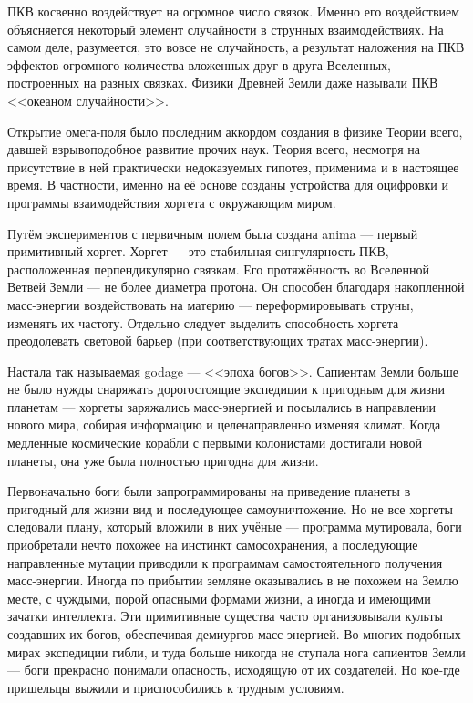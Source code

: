 \documentclass[a4paper,10pt]{book}
\begin{document}
ПКВ косвенно воздействует на огромное число связок. Именно его воздействием 
объясняется некоторый элемент случайности в струнных взаимодействиях. На самом 
деле, разумеется, это вовсе не случайность, а результат наложения на ПКВ 
эффектов огромного количества вложенных друг в друга Вселенных, построенных на 
разных связках. Физики Древней Земли даже называли ПКВ <<океаном случайности>>.

Открытие омега-поля было последним
аккордом создания в физике Теории всего, давшей взрывоподобное развитие 
прочих наук. Теория всего, несмотря на присутствие в ней практически 
недоказуемых
гипотез, применима и в настоящее время. В частности, именно на её основе созданы
устройства для оцифровки и программы взаимодействия хоргета с окружающим миром. 

Путём экспериментов с первичным полем была создана 
anima --- первый примитивный хоргет. Хоргет --- это стабильная сингулярность 
ПКВ, расположенная перпендикулярно связкам. Его протяжённость во Вселенной 
Ветвей Земли --- не более диаметра протона. Он способен благодаря накопленной 
масс-энергии воздействовать на материю --- переформировывать струны, изменять 
их частоту.
Отдельно следует выделить способность хоргета преодолевать световой барьер (при 
соответствующих тратах масс-энергии).

Настала так называемая godage --- <<эпоха богов>>. Сапиентам Земли больше не 
было нужды снаряжать дорогостоящие экспедиции к пригодным для жизни планетам 
--- хоргеты заряжались масс-энергией и посылались в направлении нового мира, 
собирая информацию и целенаправленно изменяя климат. Когда медленные 
космические корабли с первыми колонистами достигали новой планеты, она уже была 
полностью пригодна для жизни.

Первоначально боги были запрограммированы на приведение планеты в пригодный для 
жизни вид и последующее самоуничтожение. Но не все хоргеты следовали плану, 
который вложили в них учёные --- программа мутировала, боги приобретали нечто 
похожее на инстинкт самосохранения, а последующие направленные мутации 
приводили 
к программам самостоятельного получения масс-энергии. Иногда по прибытии 
земляне 
оказывались в не похожем на Землю месте, с чуждыми, порой опасными формами 
жизни, а иногда и имеющими зачатки интеллекта. Эти примитивные существа часто 
организовывали культы создавших их богов, обеспечивая  демиургов масс-энергией. 
Во многих подобных мирах экспедиции гибли, и туда больше никогда не ступала 
нога 
сапиентов Земли --- боги прекрасно понимали опасность, исходящую от их 
создателей. 
Но кое-где пришельцы выжили и приспособились к трудным условиям.
\end{document}
